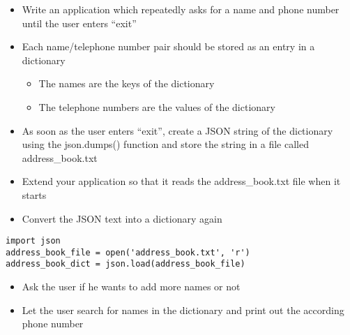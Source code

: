 \documentclass[10pt, a4paper]{beamer} %
\begin{document}
{\begin{frame}
	\begin{itemize}
		\item Write an application which repeatedly asks for a name and phone
		      number until the user enters ``exit''
		\item Each name/telephone number pair should be stored as an entry in a dictionary
		      \begin{itemize}
			      \item The names are the keys of the dictionary
			      \item The telephone numbers are the values of the dictionary
		      \end{itemize}
		\item As soon as the user enters ``exit'', create a JSON string of the dictionary using the json.dumps() function and store the string in a file called address\_book.txt
	\end{itemize}

	\framebreak

	\begin{itemize}
		\item Extend your application so that it reads the address\_book.txt file when it starts
		\item Convert the JSON text into a dictionary again
	\end{itemize}

	{
	\mdseries
	\begin{lstlisting}
import json
address_book_file = open('address_book.txt', 'r')
address_book_dict = json.load(address_book_file)
\end{lstlisting}
	}

	\begin{itemize}
		\item Ask the user if he wants to add more names or not
		\item Let the user search for names in the dictionary and print out the according phone number
	\end{itemize}

\end{frame}
}
\end{document}
